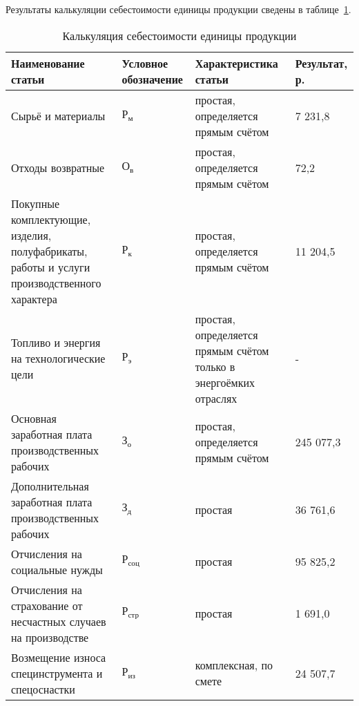 Результаты калькуляции себестоимости единицы продукции
сведены в таблице~\ref{tbl:results}.
\begin{table}[h!]
  \caption{Калькуляция себестоимости единицы продукции}
  \label{tbl:results}
  \centering
  \small{
    \begin{tabular}{| p{} | p{} |
                      p{} | p{} |}
      \hline

      Наименование статьи & Условное \newline обозначение &
      Характеристика статьи & Результат, р.
      \\ \hline

      Сырьё и материалы & $ \text{Р}_{\text{м}} $ &
      простая, определяется прямым счётом &
      7 231,8 \\ \hline

      Отходы возвратные & $ \text{О}_{\text{в}} $ &
      простая, определяется прямым счётом &
      72,2 \\ \hline

      Покупные комплектующие, изделия, полуфабрикаты, работы и услуги
      производственного характера & $ \text{Р}_{\text{к}} $ &
      простая, определяется прямым счётом &
      11 204,5 \\ \hline

      Топливо и энергия на технологические цели & $ \text{Р}_{\text{э}} $ &
      простая, определяется прямым счётом только в энергоёмких отраслях &
      - \\ \hline

      Основная заработная плата производственных рабочих & $ \text{З}_{\text{о}} $ &
      простая, определяется прямым счётом &
      245 077,3 \\ \hline

      Дополнительная \newline заработная плата производственных рабочих
      & $ \text{З}_{\text{д}} $ & простая &
      36 761,6 \\ \hline

      Отчисления на социальные нужды & $ \text{Р}_{\text{соц}} $ &
      простая &
      95 825,2 \\ \hline

      Отчисления на страхование от несчастных случаев на \newline производстве &
      $ \text{Р}_{\text{стр}} $ & простая &
      1 691,0 \\ \hline

      Возмещение износа специнструмента и спецоснастки & $ \text{Р}_{\text{из}} $ &
      комплексная, по смете &
      24 507,7 \\ \hline


\end{tabular}}
\end{table}
